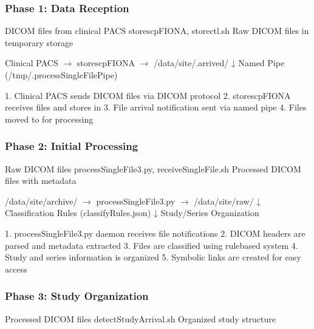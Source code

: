 \documentclass[letterpaper,10pt,english]{sphinxmanual}
\begin{document}
\subsubsection{Phase 1: Data Reception}
\label{\detokenize{Architecture/data-flow:phase-1-data-reception}}
\sphinxAtStartPar
{} DICOM files from clinical PACS
 storescpFIONA, storectl.sh
 Raw DICOM files in temporary storage

\begin{sphinxVerbatim}[commandchars=\\\{\}]
Clinical PACS \(\rightarrow\) storescpFIONA \(\rightarrow\) /data/site/.arrived/
                                ↓
                          Named Pipe (/tmp/.processSingleFilePipe)
\end{sphinxVerbatim}

\sphinxAtStartPar
{}
1. Clinical PACS sends DICOM files via DICOM protocol
2. storescpFIONA receives files and stores in 
3. File arrival notification sent via named pipe
4. Files moved to  for processing


\subsubsection{Phase 2: Initial Processing}
\label{\detokenize{Architecture/data-flow:phase-2-initial-processing}}
\sphinxAtStartPar
{} Raw DICOM files
 processSingleFile3.py, receiveSingleFile.sh
 Processed DICOM files with metadata

\begin{sphinxVerbatim}[commandchars=\\\{\}]
/data/site/archive/ \(\rightarrow\) processSingleFile3.py \(\rightarrow\) /data/site/raw/
                       ↓
                Classification Rules (classifyRules.json)
                       ↓
                Study/Series Organization
\end{sphinxVerbatim}

\sphinxAtStartPar
{}
1. processSingleFile3.py daemon receives file notifications
2. DICOM headers are parsed and metadata extracted
3. Files are classified using rule\sphinxhyphen{}based system
4. Study and series information is organized
5. Symbolic links are created for easy access


\subsubsection{Phase 3: Study Organization}
\label{\detokenize{Architecture/data-flow:phase-3-study-organization}}
\sphinxAtStartPar
{} Processed DICOM files
 detectStudyArrival.sh
 Organized study structure
\end{document}
